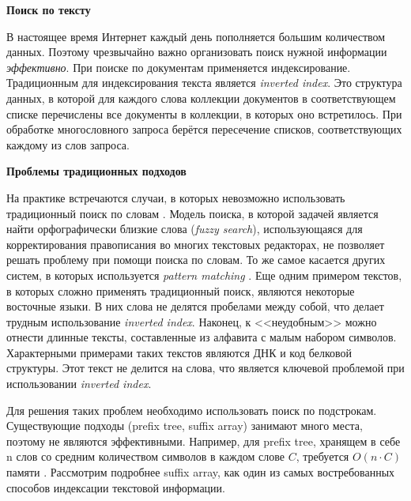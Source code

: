 
\textbf{Поиск по тексту}

В настоящее время Интернет каждый день пополняется большим количеством данных.
Поэтому чрезвычайно важно организовать поиск нужной информации \emph{эффективно}.
При поиске по документам применяется индексирование.
Традиционным для индексирования текста является \emph{inverted index}.
Это структура данных, в которой для каждого слова коллекции документов в соответствующем списке
перечислены все документы в коллекции, в которых оно встретилось.
При обработке многословного запроса берётся пересечение списков, соответствующих каждому из слов запроса.

\textbf{Проблемы традиционных подходов}

На практике встречаются случаи,
в которых невозможно использовать традиционный поиск по словам \cite{bast2013efficient}.
Модель поиска, в которой задачей является найти орфографически близкие слова (\emph{fuzzy search}),
использующаяся для корректирования правописания во многих текстовых редакторах,
не позволяет решать проблему при помощи поиска по словам.
То же самое касается других систем, в которых используется \emph{pattern matching} \cite{bai2018adaptive}.
Еще одним примером текстов, в которых сложно применять традиционный поиск,
являются некоторые восточные языки.
В них слова не делятся пробелами между собой, что делает трудным использование \emph{inverted index}.
Наконец, к <<неудобным>> можно отнести длинные тексты, составленные из алфавита с малым набором символов.
Характерными примерами таких текстов являются ДНК и код белковой структуры.
Этот текст не делится на слова, что является ключевой проблемой при использовании \emph{inverted index}.

Для решения таких проблем необходимо использовать поиск по подстрокам.
Существующие подходы (prefix tree, suffix array) занимают много места, поэтому не являются эффективными.
Например, для prefix tree, хранящем в себе n слов со средним количеством символов в каждом слове $C$,
требуется $O(n \cdot C)$ памяти \cite{aho1975efficient}.
Рассмотрим подробнее suffix array, как один из самых востребованных способов индексации текстовой информации.

